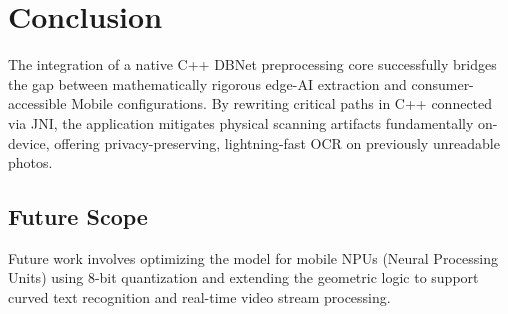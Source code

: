 \chapter{Conclusion}
The integration of a native C++ DBNet preprocessing core successfully bridges the gap between mathematically rigorous edge-AI extraction and consumer-accessible Mobile configurations. By rewriting critical paths in C++ connected via JNI, the application mitigates physical scanning artifacts fundamentally on-device, offering privacy-preserving, lightning-fast OCR on previously unreadable photos.

\section{Future Scope}
Future work involves optimizing the model for mobile NPUs (Neural Processing Units) using 8-bit quantization and extending the geometric logic to support curved text recognition and real-time video stream processing.
